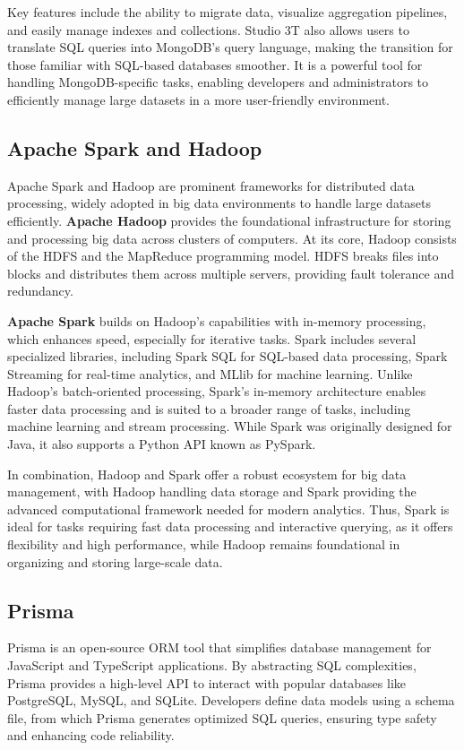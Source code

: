 Key features include the ability to migrate data, visualize aggregation pipelines, and easily manage indexes and collections. Studio 3T also allows users to translate \ac{SQL} queries into MongoDB's query language, making the transition for those familiar with \ac{SQL}-based databases smoother. It is a powerful tool for handling MongoDB-specific tasks, enabling developers and administrators to efficiently manage large datasets in a more user-friendly environment.

\subsection{Apache Spark and Hadoop}
Apache Spark and Hadoop are prominent frameworks for distributed data processing, widely adopted in big data environments to handle large datasets efficiently. 
\textbf{Apache Hadoop} provides the foundational infrastructure for storing and processing big data across clusters of computers. At its core, Hadoop consists of the \ac{HDFS} and the MapReduce programming model. \ac{HDFS} breaks files into blocks and distributes them across multiple servers, providing fault tolerance and redundancy.

\textbf{Apache Spark} builds on Hadoop's capabilities with in-memory processing, which enhances speed, especially for iterative tasks. Spark includes several specialized libraries, including Spark \ac{SQL} for SQL-based data processing, Spark Streaming for real-time analytics, and MLlib for machine learning. Unlike Hadoop's batch-oriented processing, Spark's in-memory architecture enables faster data processing and is suited to a broader range of tasks, including machine learning and stream processing. While Spark was originally designed for Java, it also supports a Python API known as PySpark.

In combination, Hadoop and Spark offer a robust ecosystem for big data management, with Hadoop handling data storage and Spark providing the advanced computational framework needed for modern analytics. Thus, Spark is ideal for tasks requiring fast data processing and interactive querying, as it offers flexibility and high performance, while Hadoop remains foundational in organizing and storing large-scale data.

\subsection{Prisma}
Prisma is an open-source \ac{ORM} tool that simplifies database management for JavaScript and TypeScript applications. By abstracting \ac{SQL} complexities, Prisma provides a high-level \ac{API} to interact with popular databases like PostgreSQL, MySQL, and SQLite. Developers define data models using a schema file, from which Prisma generates optimized \ac{SQL} queries, ensuring type safety and enhancing code reliability.

